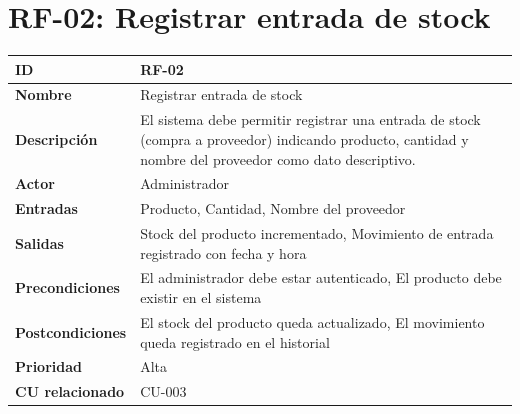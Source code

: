 \documentclass{article}
\begin{document}
\section*{RF-02: Registrar entrada de stock}
\begin{center}
\renewcommand{\arraystretch}{1.4}
\begin{tabular}{|L{4cm}|L{12cm}|}
\hline
\textbf{ID} & RF-02 \\
\hline
\textbf{Nombre} & Registrar entrada de stock \\
\hline
\textbf{Descripción} & El sistema debe permitir registrar una entrada de stock (compra a proveedor) indicando producto, cantidad y nombre del proveedor como dato descriptivo. \\
\hline
\textbf{Actor} & Administrador \\
\hline
\textbf{Entradas} & Producto, Cantidad, Nombre del proveedor \\
\hline
\textbf{Salidas} & Stock del producto incrementado, Movimiento de entrada registrado con fecha y hora \\
\hline
\textbf{Precondiciones} & El administrador debe estar autenticado, El producto debe existir en el sistema \\
\hline
\textbf{Postcondiciones} & El stock del producto queda actualizado, El movimiento queda registrado en el historial \\
\hline
\textbf{Prioridad} & Alta \\
\hline
\textbf{CU relacionado} & CU-003 \\
\hline
\end{tabular}
\end{center}
\end{document}
